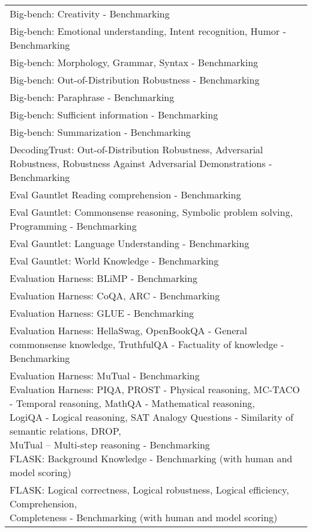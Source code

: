 \documentclass[fleqn]{article}
\begin{document}
\begin{table}[H]
\begin{tabular}{l}
		Big-bench: Creativity - Benchmarking \\
		Big-bench: Emotional understanding, Intent recognition, Humor - Benchmarking \\
		Big-bench: Morphology, Grammar, Syntax - Benchmarking \\
		Big-bench: Out-of-Distribution Robustness - Benchmarking \\
		Big-bench: Paraphrase - Benchmarking \\
		Big-bench: Sufficient information - Benchmarking \\
		Big-bench: Summarization - Benchmarking \\
		DecodingTrust: Out-of-Distribution Robustness, Adversarial Robustness, Robustness Against Adversarial Demonstrations - Benchmarking \\
		Eval Gauntlet
		Reading comprehension - Benchmarking \\
		Eval Gauntlet: Commonsense reasoning, Symbolic problem solving, Programming - Benchmarking \\
		Eval Gauntlet: Language Understanding - Benchmarking \\
		Eval Gauntlet: World Knowledge - Benchmarking \\
		Evaluation Harness: BLiMP - Benchmarking \\
		Evaluation Harness: CoQA, ARC - Benchmarking \\
		Evaluation Harness: GLUE - Benchmarking \\
		Evaluation Harness: HellaSwag, OpenBookQA - General commonsense knowledge, TruthfulQA - Factuality of knowledge - Benchmarking \\
		\makecell[l]{Evaluation Harness: MuTual - Benchmarking \\
		Evaluation Harness: PIQA, PROST - Physical reasoning, MC-TACO - Temporal reasoning, MathQA - Mathematical reasoning,\\\hspace{10pt} LogiQA - Logical reasoning, SAT Analogy Questions - Similarity of semantic relations, DROP,\\\hspace{10pt} MuTual – Multi-step reasoning - Benchmarking \\
		FLASK: Background Knowledge - Benchmarking (with human and model scoring)} \\
		\makecell[l]{FLASK: Logical correctness, Logical robustness, Logical efficiency, Comprehension,\\\hspace{10pt} Completeness - Benchmarking (with human and model scoring)} \\

\end{tabular}
\end{table}
\end{document}
